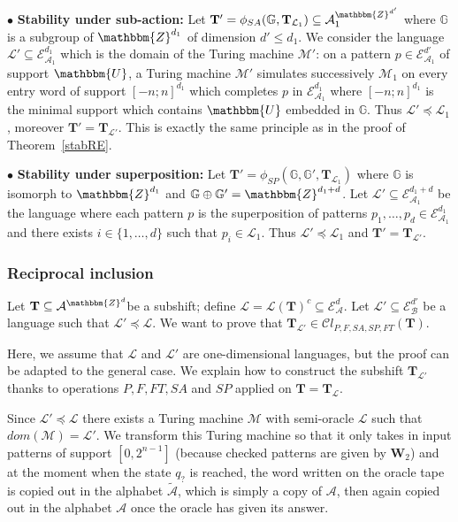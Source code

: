 \documentclass[proceedings]{stacs}
\theoremstyle{plain}\newtheorem{satz}[thm]{Satz}
\theoremstyle{definition}\newtheorem{crucial}[thm]{Crucial Definition}
\newcommand{\G}{\mathbb{G}}
\newcommand{\Z}{\mathbbm{Z}}
\newcommand{\U}{\mathbbm{U}}
\newcommand{\A}{\mathcal{A}}
\newcommand{\B}{\mathcal{B}}
\newcommand{\E}{\mathcal{E}}
\newcommand{\T}{\mathbf{T}}
\newcommand{\W}{\mathbf{W}}
\newcommand{\TM}{\mathcal{M}}
\newcommand{\Lang}{\mathcal{L}}
\begin{document}
$\bullet$ \textbf{Stability under sub-action:} Let $\T'=\phi_{SA}(\G,\T_{\Lang_1})\subseteq\A_1^{\Z^{d'}}$ where $\G$ is a subgroup of $\Z^{d_1}$ of dimension $d'\leq d_1$. We consider the language $\Lang'\subseteq\E_{\A_1}^{d_1}$ which is the domain of the Turing machine $\TM'$: on a pattern $p\in\E_{\A_1}^{d'}$ of support $\U$, a Turing machine $\TM'$ simulates successively $\TM_1$ on every entry word of support $[-n;n]^{d_1}$ which completes $p$ in $\E^{d_1}_{\A_1}$ where $[-n;n]^{d_1}$ is the minimal support which contains $\U$ embedded in $\G$. Thus $\Lang'\preceq\Lang_1$, moreover $\T'=\T_{\Lang'}$. This is exactly the same principle as in the proof of Theorem~\ref{stabRE}.

$\bullet$ \textbf{Stability under superposition:} Let $\T'=\phi_{SP}(\G,\G',\T_{\Lang_1})$ where $\G$ is isomorph to $\Z^{d_1}$ and $\G\oplus \G'=\Z^{d_1+d}$. Let $\Lang'\subseteq\E^{d_1+d}_{\A_1}$ be the language where each pattern $p$ is the superposition of patterns $p_1,\dots, p_{d}\in\E_{\A_1}^{d_1}$ and there exists $i\in\{1,\dots,d\}$ such that $p_i\in\Lang_1$. Thus $\Lang'\preceq\Lang_1$ and $\T'=\T_{\Lang'}$.




\subsubsection{Reciprocal inclusion}\label{recinclusion}

Let $\T\subseteq \A^{\Z^d}$be a subshift; define $\Lang=\Lang(\T)^c\subseteq\E_{\A}^d$. Let  $\Lang'\subseteq\E_{\B}^{d'}$ be a language such that $\mathcal{L'}\preceq\Lang$.  We want to prove that $\T_{\Lang'}\in\mathcal{C}l_{P,F,SA,SP,FT}(\T)$.  



Here, we assume that $\Lang$ and $\Lang'$ are one-dimensional languages, but the proof can be adapted to the general case. We explain how to construct the subshift $\T_{\Lang'}$ thanks to operations $P,F,FT,SA$ and $SP$ applied on $\T=\T_\Lang$.

Since $\Lang'\preceq \Lang$ there exists a Turing machine $\TM$ with semi-oracle $\Lang$ such that $dom(\TM)=\Lang'$. We transform this Turing machine so that it only takes in input patterns of support $[0,2^{n-1}]$ (because checked patterns are given by $\W_2$) and at the moment when the state $q_?$ is reached, the word written on the oracle tape is copied out in the alphabet $\widetilde{\A}$, which is simply a copy of $\A$, then again copied out in the alphabet $\A$ once the oracle has given its answer.
\end{document}
